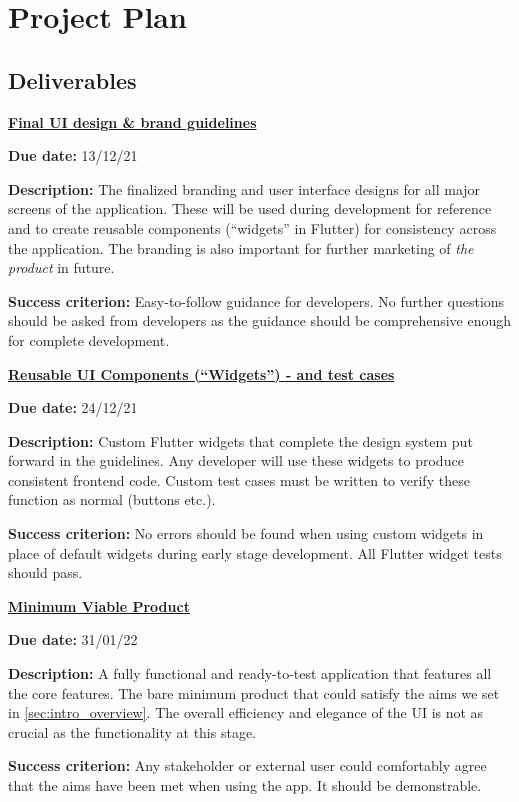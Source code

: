 \chapter{Project Plan}
\label{chap:project-plan}

\section{Deliverables}
\label{sec:deliverables}
\vspace{-3mm}
\textbf{\underline{Final UI design \& brand guidelines}}
\par
\textbf{Due date:} 13/12/21
\par
\vspace{-3mm}
\textbf{Description:} The finalized branding and user interface designs for all major screens of the application.
These will be used during development for reference and to create reusable components (``widgets'' in Flutter) for consistency across
the application. The branding is also important for further marketing of \textit{the product} in future.
\par
\vspace{-3mm}
\textbf{Success criterion:} Easy-to-follow guidance for developers. No further questions
should be asked from developers as the guidance should be comprehensive enough for complete development.
\par

\textbf{\underline{Reusable UI Components (``Widgets'') - and test cases}}
\par
\textbf{Due date:} 24/12/21
\par
\vspace{-3mm}
\textbf{Description:} Custom Flutter widgets that complete the design system put forward in the guidelines. Any developer will use
these widgets to produce consistent frontend code. Custom test cases must be written to verify these function as normal (buttons etc.).
\par
\vspace{-3mm}
\textbf{Success criterion:} No errors should be found when using custom widgets in place of default widgets during early stage development. All Flutter widget tests should pass.
\par
\pagebreak

\textbf{\underline{Minimum Viable Product}}
\par
\textbf{Due date:} 31/01/22
\par
\vspace{-3mm}
\textbf{Description:} A fully functional and ready-to-test application that features all the core features. The bare minimum product
that could satisfy the aims we set in \cref{sec:intro_overview}. The overall
efficiency and elegance of the UI is not as crucial as the functionality at this stage.
\par
\vspace{-3mm}
\textbf{Success criterion:} Any stakeholder or external user could comfortably agree that the aims have been met when
using the app. It should be demonstrable.
\par

